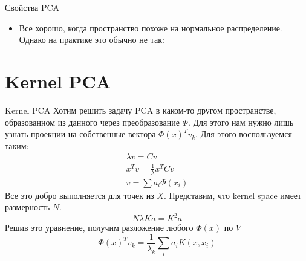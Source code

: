 \documentclass[14pt, fleqn, xcolor={dvipsnames, table}]{beamer}
\begin{document}
\begin{frame}{Свойства PCA}
\begin{itemize}
  \item Все хорошо, когда пространство похоже на нормальное распределение. Однако на практике это обычно не так:
\end{itemize}
\end{frame}

\section{Kernel PCA}
\begin{frame}{Kernel PCA}
\footnotesize
Хотим решить задачу PCA в каком-то другом пространстве, образованном из данного через преобразование $\Phi$. Для этого нам нужно лишь узнать проекции на собственные вектора $\Phi(x)^T v_k$. Для этого воспользуемся таким:
$$\begin{array}{l}
\lambda v = Cv \\
x^T v = \frac{1}{\lambda} x^T Cv \\
v = \sum a_i \Phi(x_i)
\end{array}$$
Все это добро выполняется для точек из $X$. Представим, что kernel space имеет размерность $N$.
$$
N \lambda K a = K^2 a
$$
Решив это уравнение, получим разложение любого $\Phi(x)$ по $V$
$$
\Phi(x)^Tv_k = \frac{1}{\lambda_k} \sum_i a_i K(x, x_i)
$$
\end{frame}
\end{document}
